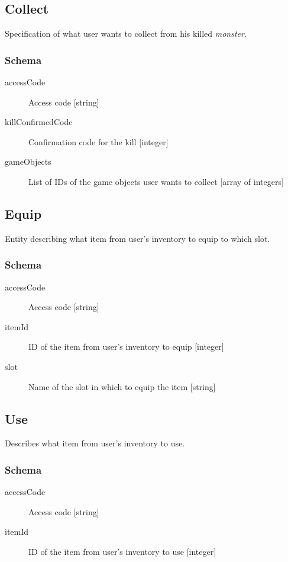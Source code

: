 	\subsection{Collect}
		\label{json:collect}
		Specification of what user wants to collect from his killed \textit{monster}.
		\subsubsection{Schema}
			\begin{description}
				\item[accessCode] Access code [string]
				\item[killConfirmedCode] Confirmation code for the kill [integer]
				\item[gameObjects] List of IDs of the game objects user wants to collect [array of integers]
			\end{description}
	
	\subsection{Equip}
		\label{json:eqip}
		Entity describing what item from user's inventory to equip to which slot.
		\subsubsection{Schema}
			\begin{description}
				\item[accessCode] Access code [string]
				\item[itemId] ID of the item from user's inventory to equip [integer]
				\item[slot] Name of the slot in which to equip the item [string]
			\end{description}

	\subsection{Use}
		\label{json:use}
		Describes what item from user's inventory to use.

		\subsubsection{Schema}
			\begin{description}
				\item[accessCode] Access code [string]
				\item[itemId] ID of the item from user's inventory to use [integer]
			\end{description}
	
